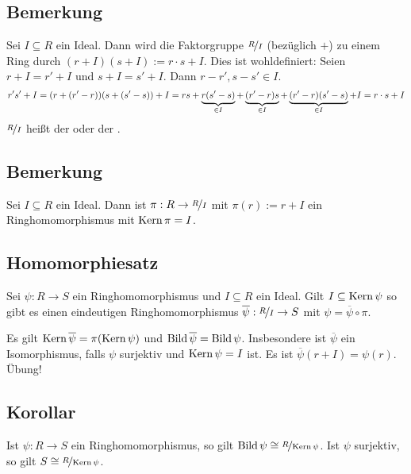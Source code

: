 \subsection[Bemerkung: Die Faktorgruppe $\nicefrac{R}{I}$ ist ein Faktorring]{Bemerkung} %
\label{sub:63}
Sei $I \subseteq R$ ein Ideal. Dann wird die Faktorgruppe $\nicefrac{R}{I}$ (bezüglich $+$) zu einem Ring durch $(r+I)(s+I) := r \cdot s + I$. Dies ist wohldefiniert:
Seien $r+I = r' +I$ und $s+I = s' +I$. Dann $r-r', s-s' \in I$. 
\[
	r' s' +I = \enbrace*{r+(r'-r)} \enbrace*{s+(s'-s)}+I = r s + \underbrace{r(s'-s)}_{\in I}+ \underbrace{(r'-r)s  }_{\in I} + \underbrace{(r'-r)(s'-s)}_{\in I}+I 
	= r \cdot s +I
\]
$\nicefrac{R}{I}$ heißt der  oder der .

\subsection[Bemerkung: Die Quotientenabbildung ist ein Ringhomomorphismus]{Bemerkung} %
\label{sub:64}
Sei $I \subseteq R$ ein Ideal. Dann ist $\pi : R \to \nicefrac{R}{I}$ mit $\pi(r) := r + I$ ein Ringhomomorphismus mit $\operatorname{Kern} \pi = I$.

\subsection{Homomorphiesatz} %
\label{sub:65}
\begin{wrapfigure}[5]{R}{1cm}
\end{wrapfigure}
Sei $\psi : R \to S$ ein Ringhomomorphismus und $I \subseteq R$ ein Ideal. Gilt $I \subseteq \operatorname{Kern} \psi$ so gibt es einen eindeutigen Ringhomomorphismus
$\overline{\psi} : \nicefrac{R}{I} \to S $ mit $\psi = \overline{\psi} \circ \pi  $.

Es gilt $\operatorname{Kern} \overline{\psi} = \pi ( \operatorname{Kern} \psi) $ und $\operatorname{Bild} \overline{\psi} = \operatorname{Bild} \psi $. Insbesondere ist $\overline{\psi} $ ein Isomorphismus, falls $\psi$ surjektiv
und $\operatorname{Kern} \psi = I$ ist. Es ist $ \overline{\psi}(r+ I) = \psi(r)$.
Übung!

\subsection[Korollar aus dem Homomorphiesatz]{Korollar} %
\label{sub:66}
Ist $\psi : R \to S$ ein Ringhomomorphismus, so gilt $\operatorname{Bild} \psi \cong \nicefrac{R}{\operatorname{Kern} \psi}$. Ist $\psi$ surjektiv, so gilt $S \cong \nicefrac{R}{\operatorname{Kern} \psi}$.

